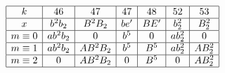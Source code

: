 \documentclass{article}
\begin{document}
\(
\begin{array}{|c|*{13}{c|}}
  \hline
  k & 46 & 47 & 47 & 48 & 52 & 53 \\ \hline
  x & b^2b_2 & B^2B_2 & be' & BE' & b_2^2 & B_2^2  \\ \hline
  m\equiv0 & ab^2b_2 & 0 & b^5 & 0 & ab_2^2 & 0 \\ \hline
  m\equiv1 & ab^2b_2 & AB^2B_2 & b^5 & B^5 & ab_2^2 & AB_2^2 \\ \hline
  m\equiv2 & 0 & AB^2B_2 & 0 & B^5 & 0 & AB_2^2 \\ \hline
\end{array}
\)
\end{document}
